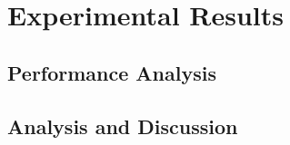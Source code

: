 \documentclass[12pt,letterpaper]{report}
\makeatletter
\newcommand{\mhz}[1]{#1~MHz}
\newcommand{\perftable}[4]{
    \begin{table}[H]
    \centering
    \begin{tabular}{@{}ll@{}}
    \toprule
    \textbf{Metric} & \textbf{Value} \\
    \midrule
    Clock Frequency & #1 \\
    CPI & #2 \\
    Throughput & #3 \\
    Power Consumption & #4 \\
    \bottomrule
    \end{tabular}
    \caption{Performance Summary}
    \end{table}
}
\theoremstyle{definition}
\theoremstyle{plain}
\makeatother
\begin{document}




\chapter{Experimental Results}

\section{Performance Analysis}



\section{Analysis and Discussion}

\end{document}

